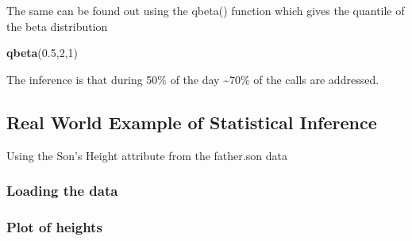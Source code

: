 \documentclass[
]{article}
\newenvironment{Shaded}{\begin{snugshade}}{\end{snugshade}}
\newcommand{\CommentTok}[1]{\textcolor[rgb]{0.56,0.35,0.01}{\textit{#1}}}
\newcommand{\ControlFlowTok}[1]{\textcolor[rgb]{0.13,0.29,0.53}{\textbf{#1}}}
\newcommand{\DecValTok}[1]{\textcolor[rgb]{0.00,0.00,0.81}{#1}}
\newcommand{\FloatTok}[1]{\textcolor[rgb]{0.00,0.00,0.81}{#1}}
\newcommand{\KeywordTok}[1]{\textcolor[rgb]{0.13,0.29,0.53}{\textbf{#1}}}
\newcommand{\NormalTok}[1]{#1}
\newcommand{\OperatorTok}[1]{\textcolor[rgb]{0.81,0.36,0.00}{\textbf{#1}}}
\newcommand{\StringTok}[1]{\textcolor[rgb]{0.31,0.60,0.02}{#1}}
\begin{document}
The same can be found out using the qbeta() function which gives the
quantile of the beta distribution

\begin{Shaded}
\begin{Highlighting}[]
\KeywordTok{qbeta}\NormalTok{(}\FloatTok{0.5}\NormalTok{,}\DecValTok{2}\NormalTok{,}\DecValTok{1}\NormalTok{)}
\end{Highlighting}
\end{Shaded}

The inference is that during 50\% of the day \textasciitilde70\% of the
calls are addressed.

\hypertarget{real-world-example-of-statistical-inference}{%
\subsection{Real World Example of Statistical
Inference}\label{real-world-example-of-statistical-inference}}

Using the Son's Height attribute from the father.son data

\hypertarget{loading-the-data}{%
\subsubsection{Loading the data}\label{loading-the-data}}

\begin{Shaded}
\end{Shaded}

\hypertarget{plot-of-heights}{%
\subsubsection{Plot of heights}\label{plot-of-heights}}
\end{document}

